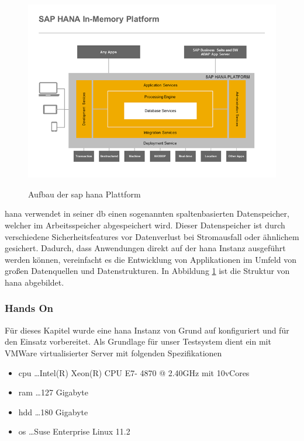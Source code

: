 \begin{figure}[H]
	\begin{center}
	\includegraphics[width=1\linewidth]{grafiken/hana-features-overview.png}
	\vspace{-20pt}
	\caption{Aufbau der \gls{sap} \gls{hana} Plattform \cite{SAPHanaAbout}}
	\vspace{-10pt}
	\label{abb:SAPHanaAbout}
	\end{center}
\end{figure}

\gls{hana} verwendet in seiner \gls{db} einen sogenannten spaltenbasierten Datenspeicher, welcher im Arbeitsspeicher abgespeichert wird. Dieser Datenspeicher ist durch verschiedene Sicherheitsfeatures vor Datenverlust bei Stromausfall oder ähnlichem gesichert.
Dadurch, dass Anwendungen direkt auf der \gls{hana} Instanz ausgeführt werden können, vereinfacht es die Entwicklung von Applikationen im Umfeld von großen Datenquellen und Datenstrukturen. In Abbildung \ref{abb:SAPHanaAbout} ist die Struktur von \gls{hana} abgebildet.

\subsubsection{Hands On}
\label{sec:db-hana-ho}
Für dieses Kapitel wurde eine \gls{hana} Instanz von Grund auf konfiguriert und für den Einsatz vorbereitet. 
Als Grundlage für unser Testsystem dient ein mit VMWare virtualisierter Server mit folgenden Spezifikationen
\begin{itemize}
	\item \gls{cpu} \ldots Intel(R) Xeon(R) CPU E7- 4870  @ 2.40GHz mit 10vCores
	\item \gls{ram} \ldots 127 Gigabyte
	\item \gls{hdd} \ldots 180 Gigabyte
	\item \gls{os} \ldots Suse Enterprise Linux 11.2	
\end{itemize}


